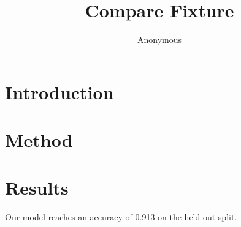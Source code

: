 \documentclass[twocolumn]{article}
\begin{document}
\title{Compare Fixture}\author{Anonymous}\maketitle
\section{Introduction}
\lipsum[1]

\lipsum[2]
\section{Method}
\lipsum[3-8]
\section{Results}
\lipsum[9-14]

Our model reaches an accuracy of 0.913 on the held-out split.

\lipsum[15-18]
\end{document}
